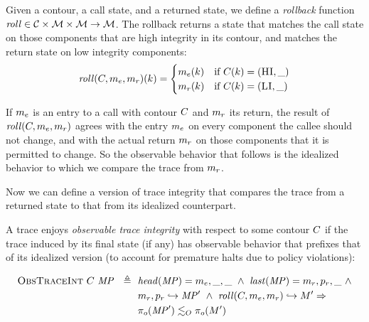 \documentclass[acmsmall,review,anonymous]{acmart}\settopmatter{printfolios=true,printccs=false,printacmref=false}
\begin{document}

      Given a contour, a call state, and a returned state, we define a
      {\em rollback} function \(\mathit{roll} \in {\mathcal C} \times {\mathcal M} \times
      {\mathcal M} \rightarrow {\mathcal M}\). The rollback returns a state that matches
      the call state on those components that are high integrity in its
      contour, and matches the return state on low integrity components:
      \[\mathit{roll}(C,m_e,m_r)(k) =
      \begin{cases}
        m_e(k) & \text{if } C(k) = (\textsc{HI},\_) \\
        m_r(k) & \text{if } C(k) = (\textsc{LI},\_) \\
      \end{cases}\]

      If \(m_e\) is an entry to a call with contour \(C\)
      and \(m_r\) its return, the result of
      \(\mathit{roll}(C,m_e,m_r)\) agrees with the
      entry \(m_e\) on every component the callee should not
      change, and with the actual return \(m_r\) on those
      components that it is permitted to change.  So the observable
      behavior that follows is the idealized behavior to which we
      compare the trace from \(m_r\).

      Now we can define a version of trace integrity that compares the trace
      from a returned state to that from its idealized counterpart.


      A trace enjoys {\em observable trace integrity} with respect to
      some contour \(C\) if the trace induced by its final
      state (if any) has observable behavior that prefixes that of its
      idealized version (to account for premature halts due to policy
      violations):

      \[\begin{split}
        \text{\sc ObsTraceInt} ~ C ~ \mathit{MP} \ \ \triangleq \ \
        & \mathit{head}(\mathit{MP}) = m_e,\_,\_ ~ \land ~
          \mathit{last}(\mathit{MP}) = m_r,p_r,\_ ~ \land \\
        & m_r,p_r \hookrightarrow \mathit{MP}' ~ \land ~
          \mathit{roll}(C,m_e,m_r) \hookrightarrow M'
          \Rightarrow \\
        & \pi_o(\mathit{MP}') \lesssim_O \pi_o(M')
      \end{split}\]
\end{document}
